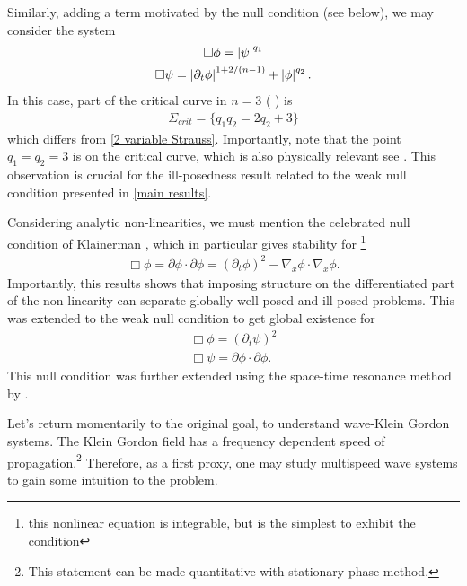 \documentclass[11pt, oneside]{amsart}
\begin{document}
	Similarly, adding a term motivated by the null condition (see below), we may consider the system
	\begin{equation}\label{Strauss null}
		\begin{gathered}
			\Box\phi=\left\lvert \psi\right\rvert^{q_1}\\
			\Box\psi=\left\lvert \partial_t\phi\right\rvert^{1+2/(n-1)}+\left\lvert \phi\right\rvert^{q_2}.
		\end{gathered}
	\end{equation}
	In this case, part of the critical curve in $n=3$ ( \cite{hidano_global_2022}) is 
	\begin{equation*}
		\begin{gathered}
			\Sigma_{crit}=\big\{q_1q_2 = 2q_2 + 3\big\}
		\end{gathered}
	\end{equation*}
	which differs from \eqref{2 variable Strauss}. Importantly, note that the point $q_1=q_2=3$ is on the critical curve, which is also physically relevant see \cite{hidano_global_2022}.  This observation is crucial for the ill-posedness result related to the weak null condition presented in \cref{main results}.
	
	Considering analytic non-linearities, we must mention the celebrated null condition of Klainerman \cite{klainerman_long-time_1982}, which in particular gives stability for \footnote{this nonlinear equation is integrable, but is the simplest to exhibit the condition}
	\begin{equation}\label{integrable null}
		\begin{gathered}
			\Box\phi=\partial\phi\cdot\partial\phi=(\partial_t\phi)^2-\nabla_x\phi\cdot\nabla_x\phi.
		\end{gathered}
	\end{equation}
	Importantly, this results shows that imposing structure on the differentiated part of the non-linearity can separate globally well-posed and ill-posed problems. This was extended to the weak null condition \cite{lindblad_weak_2003} to get global existence for
	\begin{equation}\label{weak null}
		\begin{gathered}
			\Box\phi=(\partial_t\psi)^2\\
			\Box\psi=\partial\phi\cdot\partial\phi.
		\end{gathered}
	\end{equation}
	This null condition was further extended using the space-time resonance method by \cite{Pusateri2013}.
	
	Let's return momentarily to the original goal, to understand wave-Klein Gordon systems. The Klein Gordon field has a frequency dependent speed of propagation.\footnote{This statement can be made quantitative with stationary phase method.} Therefore, as a first proxy, one may study multispeed wave systems to gain some intuition to the problem.
	
\end{document}
